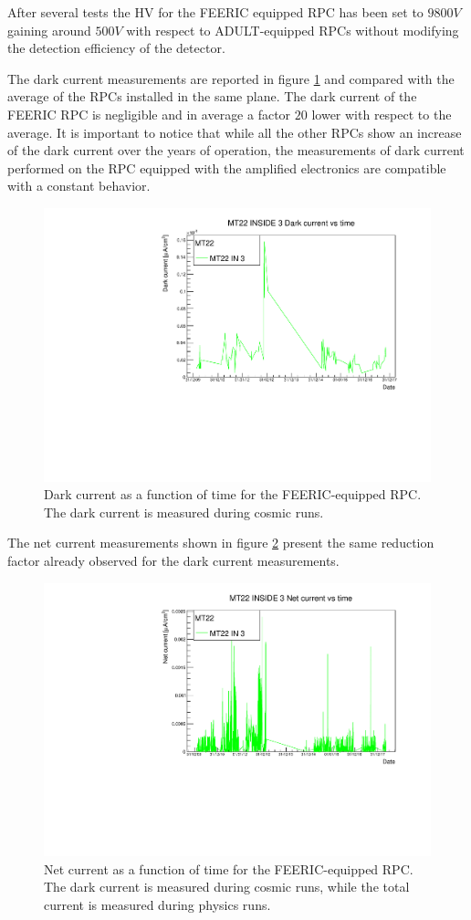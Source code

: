 After several tests the HV for the FEERIC equipped RPC has been set to $9800V$ gaining around $500V$ with respect to ADULT-equipped RPCs without modifying the detection efficiency of the detector.

The dark current measurements are reported in figure \ref{fig:FEERICiDark} and compared with the average of the RPCs installed in the same plane.
The dark current of the FEERIC RPC is negligible and in average a factor $20$ lower with respect to the average.
It is important to notice that while all the other RPCs show an increase of the dark current over the years of operation, the measurements of dark current performed on the RPC equipped with the amplified electronics are compatible with a constant behavior.

\begin{figure}[!t]
\begin{center}
\includegraphics[width=0.7\linewidth]{Chapters/Performance/Figs/iDarkFEERIC.pdf}
\caption{Dark current as a function of time for the FEERIC-equipped RPC. The dark current is measured during cosmic runs.}
\label{fig:FEERICiDark}
\end{center}
\end{figure}

The net current measurements shown in figure \ref{fig:FEERICiNet} present the same reduction factor already observed for the dark current measurements.

\begin{figure}[!t]
\begin{center}
\includegraphics[width=0.7\linewidth]{Chapters/Performance/Figs/iNetFEERIC.pdf}
\caption{Net current as a function of time for the FEERIC-equipped RPC. The dark current is measured during cosmic runs, while the total current is measured during physics runs.}
\label{fig:FEERICiNet}
\end{center}
\end{figure}

